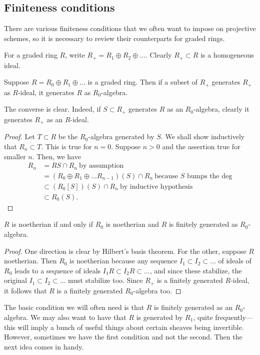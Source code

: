 \subsection{Finiteness conditions}
There are various finiteness conditions that we often want to impose on
projective schemes, so it is necessary to review their counterparts for graded
rings.

For a graded ring $R$, write $R_+ = R_1 \oplus R_2 \oplus \dots$. Clearly $R_+
\subset R$ is a homogeneous ideal.

\begin{proposition} 
Suppose $R = R_0 \oplus R_1 \oplus \dots$ is  a graded ring. Then if a subset
of $R_+$ generates $R_+$ as $R$-ideal, it generates $R$ as $R_0$-algebra.
\end{proposition} 
The converse is clear. 
Indeed, if $S \subset R_+$ generates $R$ as an $R_0$-algebra, clearly it
generates $R_+$ as an $R$-ideal. 
\begin{proof} 
Let $T \subset R$ be the $R_0$-algebra generated by $S$. We shall show
inductively that $R_n \subset T$. This is true for $n=0$. Suppose $n>0$ and the
assertion true for smaller $n$. Then, we have
\begin{align*}
R_n  & = RS \cap R_n   \ \text{by assumption} \\
& = (R_0 \oplus R_1 \oplus \dots R_{n-1})(S) \cap R_n \ \text{because $S$ bumps
the deg} \\
& \subset (R_0[S]) (S) \cap R_n \ \text{by inductive hypothesis} \\
& \subset R_0(S). \end{align*}
\end{proof} 
\begin{corollary} 
$R$ is noetherian if and only if $R_0$ is noetherian and $R$ is finitely
generated as $R_0$-algebra.
\end{corollary} 
\begin{proof} 
One direction is clear by Hilbert's basis theorem. For the other, suppose $R$
noetherian. Then $R_0$ is noetherian because any sequence $I_1 \subset I_2
\subset \dots$ of ideals of $R_0$ leads to a sequence of ideals $I_1 R \subset
I_2 R \subset \dots$, and since these stabilize, the original $I_1 \subset I_2
\subset \dots$ must stabilize too.  Since $R_+$ is a finitely generated
$R$-ideal, it follows that $R$ is a finitely generated $R_0$-algebra too.
\end{proof} 

The basic condition we will often need is that $R$ is finitely generated as an
$R_0$-algebra. We may also want to have that $R$ is generated by $R_1$, quite
frequently---this will imply a bunch of useful things about certain sheaves
being invertible. 
However, sometimes we have the first condition and not the second. Then the
next idea comes in handy.

